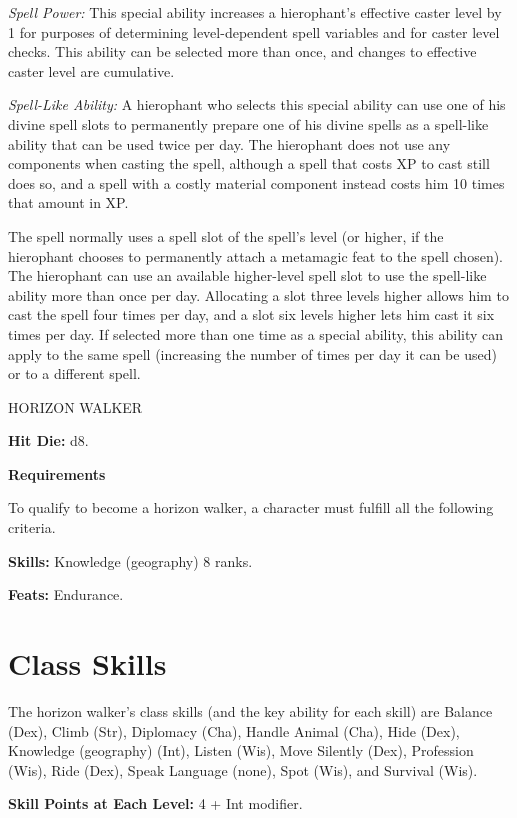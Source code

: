 \documentclass{article}
\begin{document}
\textit{Spell Power: }This special ability increases a hierophant's effective caster 
level by 1 for purposes of determining level-dependent spell variables and for 
caster level checks. This ability can be selected more than once, and changes to 
effective caster level are cumulative.

\textit{Spell-Like Ability: }A hierophant who selects this special ability can 
use one of his divine spell slots to permanently prepare one of his divine spells 
as a spell-like ability that can be used twice per day. The hierophant does not 
use any components when casting the spell, although a spell that costs XP to cast 
still does so, and a spell with a costly material component instead costs him 10 
times that amount in XP.

The spell normally uses a spell slot of the spell's level (or higher, if the hierophant 
chooses to permanently attach a metamagic feat to the spell chosen). The hierophant 
can use an available higher-level spell slot to use the spell-like ability more 
than once per day. Allocating a slot three levels higher allows him to cast the 
spell four times per day, and a slot six levels higher lets him cast it six times 
per day. If selected more than one time as a special ability, this ability can 
apply to the same spell (increasing the number of times per day it can be used) 
or to a different spell.

\vspace{12pt}
HORIZON WALKER

\textbf{Hit Die:} d8.

\textbf{Requirements}

To qualify to become a horizon walker, a character must fulfill all the following 
criteria.

\textbf{Skills:} Knowledge (geography) 8 ranks.

\textbf{Feats:} Endurance.

\section*{\textbf{Class Skills}}

The horizon walker's class skills (and the key ability for each skill) are Balance 
(Dex), Climb (Str), Diplomacy (Cha), Handle Animal (Cha), Hide (Dex), Knowledge 
(geography) (Int), Listen (Wis), Move Silently (Dex), Profession (Wis), Ride (Dex), 
Speak Language (none), Spot (Wis), and Survival (Wis).  

\parindent=3pt
\textbf{Skill Points at Each Level:} 4 + Int modifier.
\end{document}
